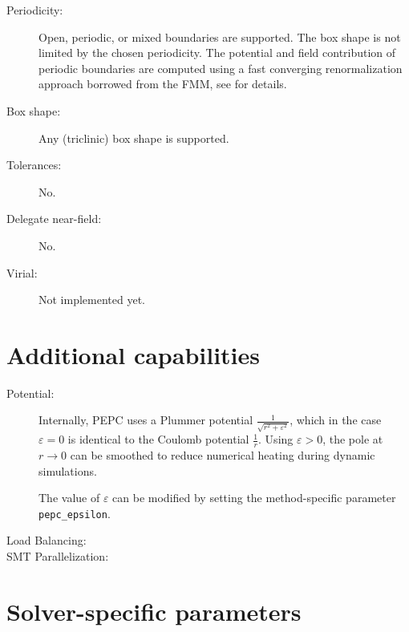 \begin{description}
  
\item[Periodicity:]
  Open, periodic, or mixed boundaries are supported. The box shape is not limited 
  by the chosen periodicity. The potential and field contribution of periodic boundaries are
  computed using a fast converging renormalization approach borrowed from the FMM,
  see  for details.

\item[Box shape:] Any (triclinic) box shape is supported.
  
\item[Tolerances:] No.
  
\item[Delegate near-field:] No.
  
\item[Virial:] Not implemented yet. 
  
\end{description}

\section*{Additional capabilities}

\begin{description}
  \item[Potential:] Internally, PEPC uses a Plummer potential $\frac{1}{\sqrt{r^2+\varepsilon^2}}$, 
    which in the case $\varepsilon = 0$ is identical to the Coulomb potential $\frac{1}{r}$. Using
    $\varepsilon > 0$, the pole at $r\rightarrow0$ can be smoothed to reduce numerical heating during
    dynamic simulations. 

    The value of $\varepsilon$ can be modified by setting the method-specific parameter \texttt{pepc\_epsilon}.

  \item[Load Balancing:] 

  \item[SMT Parallelization:] 
\end{description}



\section*{Solver-specific parameters}

